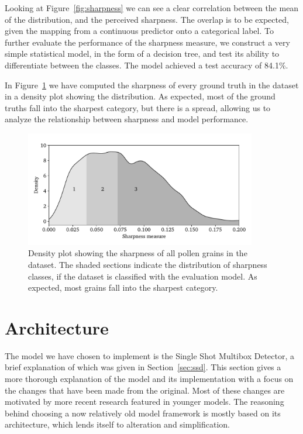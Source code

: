 Looking at Figure~\ref{fig:sharpness} we can see a clear correlation between the mean of the distribution, and the perceived sharpness.
The overlap is to be expected, given the mapping from a continuous predictor onto a categorical label.
To further evaluate the performance of the sharpness measure, we construct a very simple statistical model, in the form of a decision tree, and test its ability to differentiate between the classes.
The model achieved a test accuracy of 84.1\%. 

In Figure~\ref{fig:sharpness-all} we have computed the sharpness of every ground truth in the dataset in a density plot showing the distribution.
As expected, most of the ground truths fall into the sharpest category, but there is a spread, allowing us to analyze the relationship between sharpness and model performance.

\begin{figure}[htbp]
  \centering
  \includegraphics[width=0.9\textwidth]{figs/sharpness_all.pdf}
  \caption[Distribution of sharpness across entire dataset]{Density plot showing the sharpness of all pollen grains in the dataset. The shaded sections indicate the distribution of sharpness classes, if the dataset is classified with the evaluation model. As expected, most grains fall into the sharpest category.}\label{fig:sharpness-all}
\end{figure}

\section{Architecture}

The model we have chosen to implement is the Single Shot Multibox Detector, a brief explanation of which was given in Section~\ref{sec:ssd}.
This section gives a more thorough explanation of the model and its implementation with a focus on the changes that have been made from the original.
Most of these changes are motivated by more recent research featured in younger models.
The reasoning behind choosing a now relatively old model framework is mostly based on its architecture, which lends itself to alteration and simplification.


